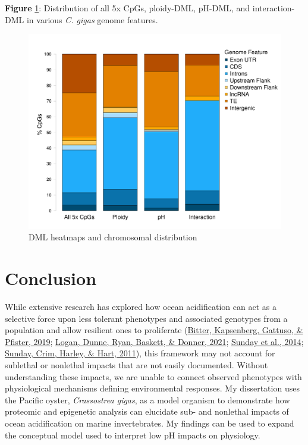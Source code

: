 \documentclass [11pt, proquest] {uwthesis}[2015/03/03]
\begin{document}
\textbf{Figure} \ref{fig:DMLgenomicloc}: Distribution of all 5x CpGs, ploidy-DML, pH-DML, and interaction-DML in various \emph{C. gigas} genome features.\newline
\begin{figure}[h]
\centering
  \includegraphics[width=1\textwidth]{figure/Ch4/Figure4.4.pdf}
  \caption{DML heatmaps and chromosomal distribution}
  \label{fig:DMLgenomicloc}
\end{figure}
\clearpage

\hypertarget{conclusion-4}{%
\chapter*{Conclusion}\label{conclusion-4}}

While extensive research has explored how ocean acidification can act as a selective force upon less tolerant phenotypes and associated genotypes from a population and allow resilient ones to proliferate (\protect\hyperlink{ref-Bitter2019}{Bitter, Kapsenberg, Gattuso, \& Pfister, 2019}; \protect\hyperlink{ref-Logan2021}{Logan, Dunne, Ryan, Baskett, \& Donner, 2021}; \protect\hyperlink{ref-Sunday2014}{Sunday et al., 2014}; \protect\hyperlink{ref-Sunday2011}{Sunday, Crim, Harley, \& Hart, 2011}), this framework may not account for sublethal or nonlethal impacts that are not easily documented. Without understanding these impacts, we are unable to connect observed phenotypes with physiological mechanisms defining environmental responses. My dissertation uses the Pacific oyster, \emph{Crassostrea gigas}, as a model organism to demonstrate how proteomic and epigenetic analysis can elucidate sub- and nonlethal impacts of ocean acidification on marine invertebrates. My findings can be used to expand the conceptual model used to interpret low pH impacts on physiology.
\end{document}
